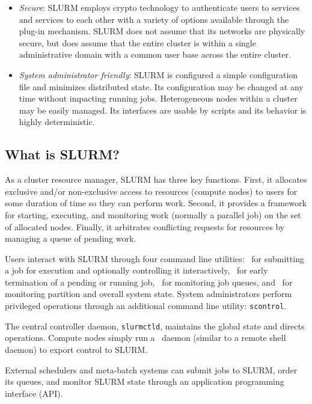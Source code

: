 \begin{itemize}
\item {\em Secure}: SLURM employs crypto technology to authenticate 
users to services and services to each other with a variety of options 
available through the plug-in mechanism.  
SLURM does not assume that its networks are physically secure, 
but does assume that the entire cluster is within a single 
administrative domain with a common user base across the 
entire cluster.

\item {\em System administrator friendly}: SLURM is configured a 
simple configuration file and minimizes distributed state.  
Its configuration may be changed at any time without impacting running jobs. 
Heterogeneous nodes within a cluster may be easily managed.
Its interfaces are usable by scripts and its behavior is highly 
deterministic.

\end{itemize}

\subsection{What is SLURM?}

As a cluster resource manager, SLURM has three key functions.  First,
it allocates exclusive and/or non-exclusive access to resources 
(compute nodes) to users for 
some duration of time so they can perform work.  Second, it provides 
a framework for starting, executing, and monitoring work (normally a 
parallel job) on the set of allocated nodes.  Finally, it arbitrates 
conflicting requests for resources by managing a queue of pending work.

Users interact with SLURM through four command line utilities: 
\srun\ for submitting a job for execution and optionally controlling it
interactively, 
\scancel\ for early termination of a pending or running job, 
\squeue\ for monitoring job queues, and 
\sinfo\ for monitoring partition and overall system state.
System administrators perform privileged operations through an additional
command line utility: {\tt scontrol}.

The central controller daemon, {\tt slurmctld}, maintains the global state 
and directs operations.
Compute nodes simply run a \slurmd\ daemon (similar to a remote shell 
daemon) to export control to SLURM.  

External schedulers and meta-batch systems can submit jobs to SLURM, 
order its queues, and monitor SLURM state through an application 
programming interface (API).

